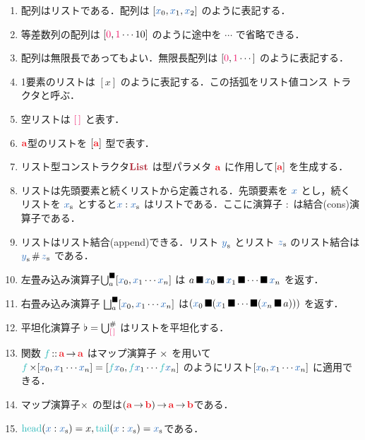 \documentclass[a5paper,twoside,fleqn,draft]{jsbook}
\begin{document}
\begin{enumerate}
\item 配列はリストである．配列は $[\hVar{x}_0,\hVar{x}_1,\hVar{x}_2]$ のように表記する．
\item 等差数列の配列は $[\hConstant{0},\hConstant{1}\dotsb10]$ のように途中を $\dotsb$ で省略できる．
\item 配列は無限長であってもよい．無限長配列は $[\hConstant{0},\hConstant{1}\dotsb]$ のように表記する．
\item 1要素のリストは $[x]$ のように表記する．この括弧をリスト値コンス
  トラクタと呼ぶ．
\item 空リストは ${\hEmptyList}$ と表す．
\item $\hTypeName{a}$型のリストを $\hListConstruct{\hTypeName{a}}$ 型で表す．
\item リスト型コンストラクタ$\mListTypeConstructor$ は型パラメタ $\hTypeName{a}$ に作用して$\hListConstruct{\hTypeName{a}}$ を生成する．
\item リストは先頭要素と続くリストから定義される．先頭要素を $\hVar{x}$ とし，続くリストを $\hListVar{x}$ とすると$\hVar{x}:\hListVar{x}$ はリストである．ここに演算子 $:$ は結合(cons)演算子である．
\item リストはリスト結合(append)できる．リスト $\hListVar{y}$ とリスト $\hListVar{z}$ のリスト結合は $\hListVar{y}\hAppend\hListVar{z}$ である．
\item 左畳み込み演算子$\hFold^{\hAnyBinOp}_a[\hVar{x}_0,\hVar{x}_1\dotsb \hVar{x}_n]$ は $a\hAnyBinOp \hVar{x}_0\hAnyBinOp \hVar{x}_1\hAnyBinOp\dotsb\hAnyBinOp \hVar{x}_n$ を返す．
\item 右畳み込み演算子 $\hFoldRight^{\hAnyBinOp}_{a}[\hVar{x}_0,\hVar{x}_1\dotsb \hVar{x}_n]$ は$(\hVar{x}_0\hAnyBinOp(\hVar{x}_1\hAnyBinOp\dotsb\hAnyBinOp(\hVar{x}_n\hAnyBinOp a)))$ を返す．
\item 平坦化演算子 $\mJoinList=\hFold_{\hEmptyList}^{\hAppend}$ はリストを平坦化する．
\item 関数 $\hFunc{f}\hIsTypeOf\mProjEXP{\hTypeName{a} }{\hTypeName{a} }$ はマップ演算子 $\operatorname{\times}$ を用いて $\hFunc{f}\hMap[\hVar{x}_0,\hVar{x}_1\dotsb \hVar{x}_n]=[\hFunc{f}\hVar{x}_0,\hFunc{f}\hVar{x}_1\dotsb \hFunc{f}\hVar{x}_n]$ のようにリスト$[\hVar{x}_0,\hVar{x}_1\dotsb \hVar{x}_n]$ に適用できる．
\item マップ演算子$\operatorname{\times}$ の型は$\mProjEXP{(\mProjEXP{\hTypeName{a} }{\hTypeName{b}})}{\mProjEXP{\hTypeName{a} }{\hTypeName{b} }}$である．
\item $\mHead(\hVar{x}:\hListVar{x})=x,\mTail(\hVar{x}:\hListVar{x})=\hListVar{x}$である．
\end{enumerate}
\end{document}
